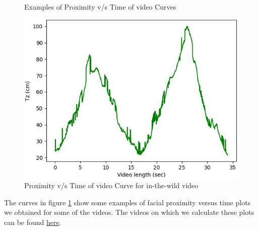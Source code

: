 \begin{figure}[h]
{{    }}
    \quad
    \caption[Proximity v/s Time curves]{Examples of Proximity v/s Time of video Curves}
    \label{fig:distCurve}
\end{figure}

\begin{figure}[h]
  \centering
    \includegraphics[scale=0.35]{DistancePreservingRedaction/plot-6}
    \caption[Proximity v/s Time curve in-the-wild]{Proximity v/s Time of video Curve for in-the-wild video}
    \label{fig:distCurve_inTheWild} 
\end{figure}

The curves in figure \ref{fig:distCurve} show some examples of facial proximity versus time plots we obtained for some of the videos. The videos on which we calculate these plots can be found \href{https://drive.google.com/drive/folders/1HEZISJiaaP0LAooNuELbls8TPWqtTL0M?usp=sharing}{here}.

